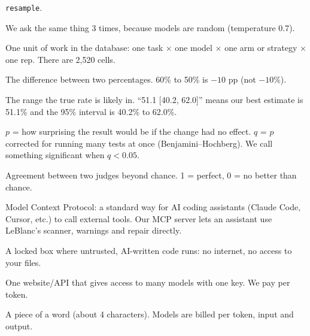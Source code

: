 \documentclass[11pt]{article}
\begin{document}
\begin{description}[style=nextline, leftmargin=1.2em]
      \texttt{resample}.
\item[Rep (repetition)] We ask the same thing 3 times, because models are random (temperature 0.7).
\item[Cell] One unit of work in the database: one task $\times$ one model $\times$ one arm or strategy $\times$
      one rep. There are 2{,}520 cells.
\item[pp (percentage points)] The difference between two percentages. 60\% to 50\% is $-10$ pp (not $-10\%$).
\item[CI (confidence interval)] The range the true rate is likely in. ``51.1 [40.2, 62.0]'' means our best
      estimate is 51.1\% and the 95\% interval is 40.2\% to 62.0\%.
\item[$p$ and $q$] $p$ = how surprising the result would be if the change had no effect. $q$ = $p$ corrected for
      running many tests at once (Benjamini--Hochberg). We call something significant when $q<0.05$.
\item[Cohen's $\kappa$ (kappa)] Agreement between two judges beyond chance. 1 = perfect, 0 = no better than
      chance.
\item[MCP] Model Context Protocol: a standard way for AI coding assistants (Claude Code, Cursor, etc.) to call
      external tools. Our MCP server lets an assistant use LeBlanc's scanner, warnings and repair directly.
\item[Sandbox / jail] A locked box where untrusted, AI-written code runs: no internet, no access to your files.
\item[OpenRouter] One website/API that gives access to many models with one key. We pay per token.
\item[Token] A piece of a word (about 4 characters). Models are billed per token, input and output.
\end{description}

\end{document}
